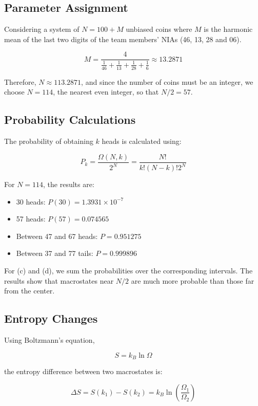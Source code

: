 \subsection{Parameter Assignment}

Considering a system of $N=100+M$ unbiased coins where $M$ is the harmonic mean of the last two digits of the team members' NIAs (46, 13, 28 and 06).

\[
M=\frac{4}{\frac{1}{46}+\frac{1}{13}+\frac{1}{28}+\frac{1}{6}}
\approx 13.2871
\]

Therefore, $N \approx 113.2871$, and since the number of coins must be an integer, we choose $N=114$, the nearest even integer, so that $N/2=57$. 


\subsection{Probability Calculations}

The probability of obtaining $k$ heads is calculated using:

\[
P_k=\frac{\Omega(N,k)}{2^N}
=\frac{N!}{k!(N-k)!2^N}
\]

For $N=114$, the results are:

\begin{itemize}
    \item[(a)] 30 heads:
    $P(30)=1.3931\times10^{-7}$

    \item[(b)] 57 heads:
    $P(57)=0.074565$

    \item[(c)] Between 47 and 67 heads:
    $P=0.951275$

    \item[(d)] Between 37 and 77 tails:
    $P=0.999896$
\end{itemize}

For (c) and (d), we sum the probabilities over the corresponding intervals. The results show that macrostates near $N/2$ are much more probable than those far from the center.


\subsection{Entropy Changes}

Using Boltzmann's equation,

\[
S=k_B\ln\Omega
\]

the entropy difference between two macrostates is:

\[
\Delta S=S(k_1)-S(k_2)
=k_B\ln\left(\frac{\Omega_1}{\Omega_2}\right)
\]

